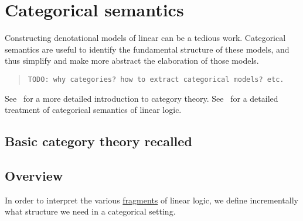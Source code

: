 \chapter{Categorical semantics}\label{categorical-semantics}

Constructing denotational models of linear can be a tedious work.
Categorical semantics are useful to identify the fundamental structure
of these models, and thus simplify and make more abstract the
elaboration of those models.

\begin{quotation}
\texttt{TODO: why categories? how to extract categorical models? etc.}
\end{quotation}

See~\cite{categoriesworkmath} for a more detailed introduction to category theory. See~\cite{catsemll} for a detailed treatment of categorical semantics of linear logic.

\section{Basic category theory recalled}\label{basic-category-theory-recalled}

\begin{definition}[Category]
\end{definition}

\begin{definition}[Functor]
\end{definition}

\begin{definition}
\end{definition}

\begin{definition}[Adjunction]
\end{definition}


\begin{definition}[Monad]
\end{definition}



\section{Overview}\label{overview}

In order to interpret the various \hyperref[fragment]{fragments} of linear
logic, we define incrementally what structure we need in a categorical
setting.

